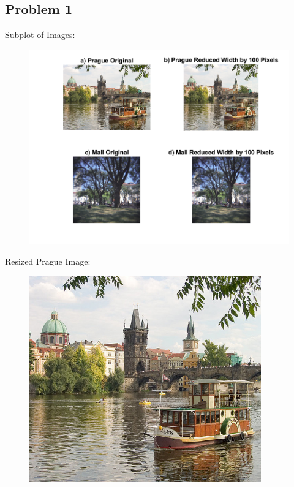 \documentclass[12pt]{article}
\begin{document}
\subsection*{Problem 1}
Subplot of Images:
\begin{figure}[H]
  \includegraphics[width=\linewidth]{PS1_Q1.png}
  \label{fig:Subplot of Images}
\end{figure}

\noindent
Resized Prague Image:
\begin{figure}[H]
  \includegraphics[width=100mm]{outputReduceWidthPrague.png}
  \label{fig:Resized Prague Image}
\end{figure}
\end{document}
